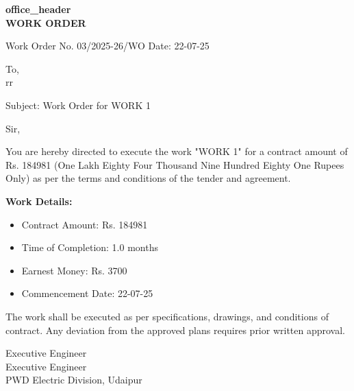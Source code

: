 \documentclass[12pt,a4paper]{article}
\begin{document}
\begin{center}
\textbf{{{office_header}}}\\[0.3cm]
\textbf{WORK ORDER}\\[0.2cm]
\end{center}

\vspace{0.5cm}

\noindent
Work Order No. 03/2025-26/WO \hfill Date: 22-07-25

\vspace{0.5cm}

\noindent
To,\\
rr

\vspace{0.3cm}

\noindent
Subject: Work Order for WORK 1

\vspace{0.3cm}

\noindent
Sir,

\vspace{0.3cm}

\noindent
You are hereby directed to execute the work "WORK 1" for a contract amount of Rs. 184981 (One Lakh Eighty Four Thousand Nine Hundred Eighty One Rupees Only) as per the terms and conditions of the tender and agreement.

\vspace{0.3cm}

\noindent
\textbf{Work Details:}
\begin{itemize}
\item Contract Amount: Rs. 184981
\item Time of Completion: 1.0 months
\item Earnest Money: Rs. 3700
\item Commencement Date: 22-07-25
\end{itemize}

\vspace{0.3cm}

\noindent
The work shall be executed as per specifications, drawings, and conditions of contract. Any deviation from the approved plans requires prior written approval.

\vspace{1cm}

\noindent
\hfill Executive Engineer\\
\hfill Executive Engineer\\
\hfill PWD Electric Division, Udaipur
\end{document}
